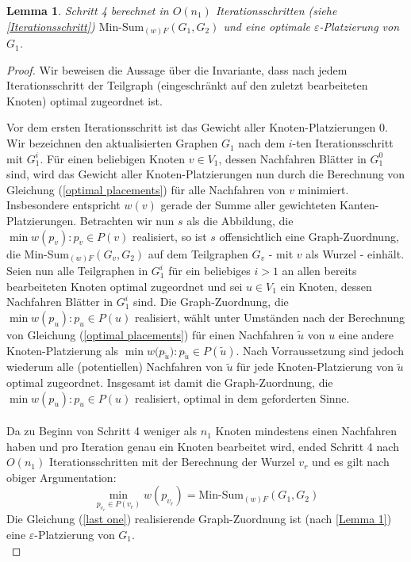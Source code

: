 \documentclass[a4paper, 12pt, twoside]{article}
\theoremstyle{Format1} %
\newtheorem{Lem}[Def]{Lemma}                %
\begin{document}
\begin{Lem} \label{Lemma 2}
	Schritt 4 berechnet in $O(n_1)$ Iterationsschritten (siehe \ref{Iterationsschritt}) $\text{Min-Sum}_{(w)F}(G_1,G_2)$ und
	eine optimale $\varepsilon$-Platzierung von $G_1$.
\end{Lem}

\begin{proof}
Wir beweisen die Aussage über die Invariante, dass nach jedem Iterationsschritt der Teilgraph (eingeschränkt auf
den zuletzt bearbeiteten Knoten) optimal zugeordnet ist.

Vor dem ersten Iterationsschritt ist das Gewicht aller Knoten-Platzierungen $0$.
Wir bezeichnen den aktualisierten Graphen $G_1$ nach dem $i$-ten Iterationsschritt mit $G_1^i$.
Für einen beliebigen Knoten $v \in V_1$, dessen Nachfahren Blätter in $G_1^0$ sind, wird das Gewicht aller Knoten-Platzierungen nun durch die Berechnung von Gleichung (\ref{optimal placements})
für alle Nachfahren von $v$ minimiert. Insbesondere entspricht $w(v)$ gerade der Summe aller gewichteten Kanten-Platzierungen. Betrachten wir nun $s$ als die Abbildung, die $\min{w(p_v)}: p_v \in P(v)$ realisiert,
so ist $s$ offensichtlich eine Graph-Zuordnung, die Min-Sum$_{(w)F}(G_v, G_2)$ auf dem Teilgraphen $G_v$ - mit $v$ als Wurzel - einhält.
\\
Seien nun alle Teilgraphen in $G_1^i$ für ein beliebiges $i>1$ an allen bereits bearbeiteten Knoten optimal zugeordnet und sei $u \in V_1$ ein Knoten, dessen
Nachfahren Blätter in $G_1^i$ sind. Die Graph-Zuordnung, die $\min{w(p_u)}: p_u \in P(u)$ realisiert, wählt unter Umständen nach der Berechnung von Gleichung (\ref{optimal placements})
für einen Nachfahren $\tilde{u}$ von $u$ eine andere Knoten-Platzierung als $\min{w(p_{\tilde{u}}}): p_{\tilde{u}} \in P(\tilde{u})$. Nach Vorraussetzung sind jedoch
wiederum alle (potentiellen) Nachfahren von $\tilde{u}$ für jede Knoten-Platzierung von $\tilde{u}$ optimal zugeordnet. Insgesamt ist damit die Graph-Zuordnung, die $\min{w(p_u)}: p_u \in P(u)$ realisiert,
optimal in dem geforderten Sinne.
\\
\\
Da zu Beginn von Schritt 4 weniger als $n_1$ Knoten mindestens einen Nachfahren haben und pro Iteration genau ein Knoten bearbeitet wird,
ended Schritt 4 nach $O(n_1)$ Iterationsschritten mit der Berechnung der Wurzel $v_r$ und es gilt nach obiger Argumentation:
\begin{equation}
	\min_{p_{v_r} \in P(v_r)}{w(p_{v_r})} = \text{Min-Sum}_{(w)F}(G_1,G_2) \label {last one}
\end{equation}
Die Gleichung (\ref{last one}) realisierende Graph-Zuordnung ist (nach \ref{Lemma 1}) eine $\varepsilon$-Platzierung von $G_1$.
\\
\end{proof}
\end{document}
